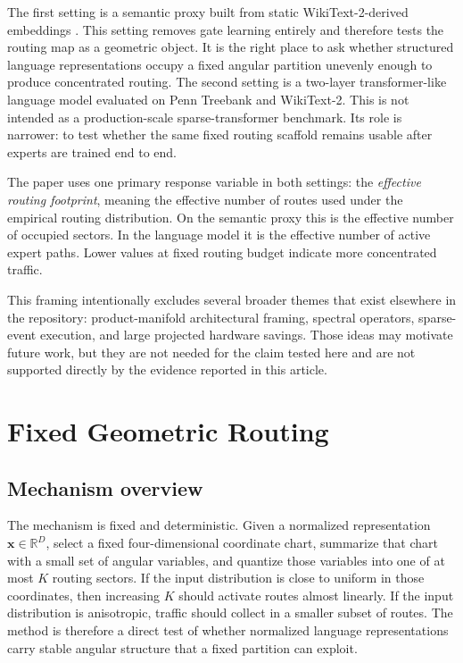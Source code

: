 \documentclass[11pt,letterpaper]{article}
\begin{document}
The first setting is a semantic proxy built from static WikiText-2-derived embeddings \citep{merity2016wt2}. This setting removes gate learning entirely and therefore tests the routing map as a geometric object. It is the right place to ask whether structured language representations occupy a fixed angular partition unevenly enough to produce concentrated routing. The second setting is a two-layer transformer-like language model evaluated on Penn Treebank \citep{ptb1993} and WikiText-2. This is not intended as a production-scale sparse-transformer benchmark. Its role is narrower: to test whether the same fixed routing scaffold remains usable after experts are trained end to end.

The paper uses one primary response variable in both settings: the \emph{effective routing footprint}, meaning the effective number of routes used under the empirical routing distribution. On the semantic proxy this is the effective number of occupied sectors. In the language model it is the effective number of active expert paths. Lower values at fixed routing budget indicate more concentrated traffic.

This framing intentionally excludes several broader themes that exist elsewhere in the repository: product-manifold architectural framing, spectral operators, sparse-event execution, and large projected hardware savings. Those ideas may motivate future work, but they are not needed for the claim tested here and are not supported directly by the evidence reported in this article.

\section{Fixed Geometric Routing}
\subsection{Mechanism overview}
The mechanism is fixed and deterministic. Given a normalized representation $\mathbf{x}\in\mathbb{R}^D$, select a fixed four-dimensional coordinate chart, summarize that chart with a small set of angular variables, and quantize those variables into one of at most $K$ routing sectors. If the input distribution is close to uniform in those coordinates, then increasing $K$ should activate routes almost linearly. If the input distribution is anisotropic, traffic should collect in a smaller subset of routes. The method is therefore a direct test of whether normalized language representations carry stable angular structure that a fixed partition can exploit.
\end{document}
